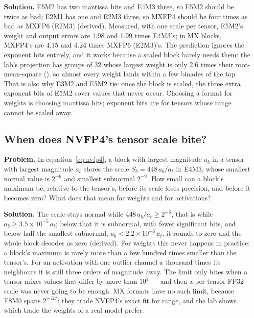 \textbf{Solution.} E5M2 has two mantissa bits and E4M3 three, so E5M2 should be
twice as bad; E2M1 has one and E2M3 three, so MXFP4 should be four times as bad
as MXFP6 (E2M3) (derived). Measured, with one scale per tensor, E5M2's weight and
output errors are 1.98 and 1.99 times E4M3's; in MX blocks, MXFP4's are 4.15 and
4.24 times MXFP6 (E2M3)'s. The prediction ignores the exponent bits entirely, and
it works because a scaled block barely needs them: the lab's projection has
groups of 32 whose largest weight is only 2.6 times their root-mean-square
(), so almost every weight lands within a few
binades of the top. That is also why E3M2 and E5M2 tie: once the block is
scaled, the three extra exponent bits of E5M2 cover values that never occur.
Choosing a format for weights is choosing mantissa bits; exponent bits are for
tensors whose range cannot be scaled away.

\subsection{When does NVFP4's tensor scale bite?}
\textbf{Problem.} In equation~\eqref{eq:nvfp4}, a block with largest magnitude $a_b$
in a tensor with largest magnitude $a_t$ stores the scale
$S_b = 448\,a_b / a_t$ in E4M3, whose smallest normal value is $2^{-6}$ and
smallest subnormal $2^{-9}$. How small can a block's maximum be, relative to the
tensor's, before its scale loses precision, and before it becomes zero? What
does that mean for weights and for activations?

\textbf{Solution.} The scale stays normal while $448\,a_b/a_t \ge 2^{-6}$, that is
while $a_b \ge 3.5 \times 10^{-5}\,a_t$; below that it is subnormal, with fewer
significant bits, and below half the smallest subnormal, $a_b < 2.2 \times
10^{-6}\,a_t$, it rounds to zero and the whole block decodes as zero (derived).
For weights this never happens in practice: a block's maximum is rarely more
than a few hundred times smaller than the tensor's. For an activation with one
outlier channel a thousand times its neighbours it is still three orders of
magnitude away. The limit only bites when a tensor mixes values that differ by
more than $10^{4}$ --- and then a per-tensor FP32 scale was never going to be
enough. MX formats have no such limit, because E8M0 spans $2^{\pm127}$: they
trade NVFP4's exact fit for range, and the lab shows which trade the weights
of a real model prefer.
